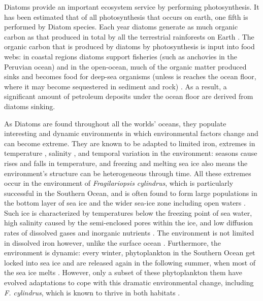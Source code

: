 Diatoms provide an important ecosystem service by performing photosynthesis.
It has been estimated that of all photosynthesis that occurs on earth, one fifth is performed by Diatom species.
Each year diatoms generate as much organic carbon as that produced in total by all the terrestrial rainforests on Earth \parencite{Armbrust2009}.
The organic carbon that is produced by diatoms by photosynthesis is input into food webs: in coastal regions diatoms support fisheries (such as anchovies in the Peruvian ocean) and in the open-ocean, much of the organic matter produced sinks and becomes food for deep-sea organisms (unless is reaches the ocean floor, where it may become sequestered in sediment and rock) \parencite{Armbrust2009,Bowler2010}.
As a result, a significant amount of petroleum deposits under the ocean floor are derived from diatoms sinking.

As Diatoms are found throughout all the worlds’ oceans, they populate interesting and dynamic environments in which environmental factors change and can become extreme.
They are known to be adapted to limited iron, extremes in temperature \parencite{Arrigo2012,Bayer-Giraldi2011,Bowler2010}, salinity \parencite{Krell2006}, and temporal variation in the environment: seasons cause rises and falls in temperature, and freezing and melting sea ice also means the environment’s structure can be heterogeneous through time.
All these extremes occur in the environment of \textit{Fragilariopsis cylindrus}, which is particularly successful in the Southern Ocean, and is often found to form large populations in the bottom layer of sea ice and the wider sea-ice zone including open waters \parencite{Kang1992}.
Such ice is characterized by temperatures below the freezing point of sea water, high salinity caused by the semi-enclosed pores within the ice, and low diffusion rates of dissolved gases and inorganic nutrients \parencite{Thomas2002}.
The environment is not limited in dissolved iron however, unlike the surface ocean \parencite{Wang2014}.
Furthermore, the environment is dynamic: every winter, phytoplankton in the Southern Ocean get locked into sea ice and are released again in the following summer, when most of the sea ice melts \parencite{Vancoppenolle2013}.
However, only a subset of these phytoplankton them have evolved adaptations to cope with this dramatic environmental change, including \textit{F. cylindrus}, which is known to thrive in both habitats \parencite{Bayer-Giraldi2011,Vancoppenolle2013}.

